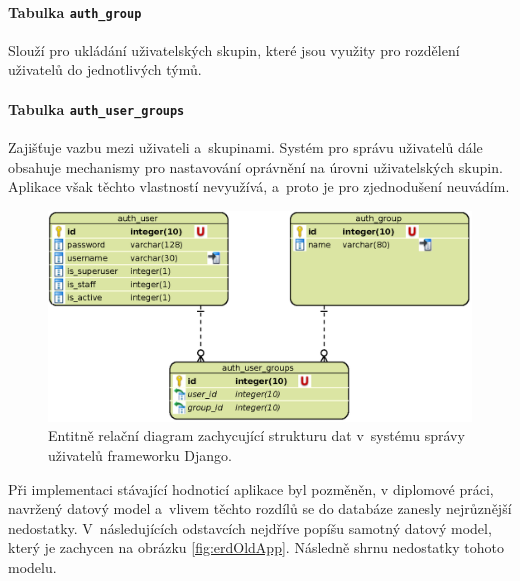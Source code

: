 \documentclass[
  digital,
  twoside,
  table, 
  nolof, 
  nolot
]{fithesis3}
\begin{document}
\paragraph{Tabulka \texttt{auth\_group}} Slouží pro ukládání uživatelských skupin, které jsou využity pro rozdělení uživatelů do jednotlivých týmů. 

\paragraph{Tabulka \texttt{auth\_user\_groups}} Zajišťuje vazbu mezi uživateli a~skupinami. Systém pro správu uživatelů dále obsahuje mechanismy pro nastavování oprávnění na úrovni uživatelských skupin. Aplikace však těchto vlastností nevyužívá, a~proto je pro zjednodušení neuvádím.

\begin{figure}[h!]
    \centering
    \includegraphics[width=12cm]{images/ERD-django.eps}
    \caption{Entitně relační diagram zachycující strukturu dat v~systému správy uživatelů frameworku Django.}
    \label{fig:erdDjango}
\end{figure}

Při implementaci stávající hodnoticí aplikace byl pozměněn, v diplomové práci, navržený datový model a~vlivem těchto rozdílů se do databáze zanesly nejrůznější nedostatky. V~následujících odstavcích nejdříve popíšu samotný datový model, který je zachycen na obrázku \ref{fig:erdOldApp}. Následně shrnu nedostatky tohoto modelu. 
\end{document}

